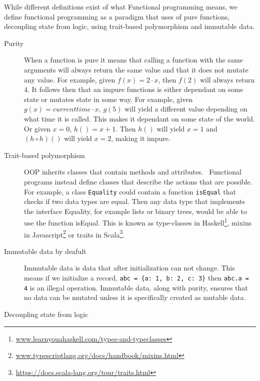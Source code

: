  While different definitions exist of what Functional programming means, we
 define functional programming as a paradigm that uses of pure functions,
 decoupling state from logic, using trait-based polymorphism and
 immutable data.

\begin{description}
\item[ Purity ]

When a function is pure it means that calling a function with the same arguments
        will always return the same value and that it does not mutate any value.
        For example, given $f(x) = 2\cdot x$, then $f(2)$ will always
        return $4$. It follows then that an impure functions is either dependant
        on some state or mutates state in some way. For example, given $g(x) =
        currenttime \cdot x$, $g(5)$ will yield a different value depending on
        what time it is called. This makes it dependant on some state of the
        world. Or given $x=0$, $h()=x+1$. Then $h()$ will yield $x=1$ and $(h
        \circ h)()$ will yield $x=2$, making it impure.~\cite{wikipedia_pure}

	\item[ Trait-based polymorphism ]

		OOP inherits classes that contain methods and
attributes.~\cite{Gamma:1995:DPE:186897} Functional programs instead
define classes that describe the actions that are possible. For example, a
class \texttt{Equality} could contain a function \texttt{isEqual} that checks
if two data types are equal. Then any data type that implements the interface
Equality, for example lists or binary trees, would be able to use the function
isEqual.  This is known as type-classes in
Haskell\footnote{\url{www.learnyouahaskell.com/types-and-typeclasses}}, mixins
in Javascript\footnote{\url{www.typescriptlang.org/docs/handbook/mixins.html}}
or traits in Scala\footnote{\url{https://docs.scala-lang.org/tour/traits.html}}.

\item[ Immutable data by deafult ]

Immutable data is data that after initialization can not change. This means if
we initialize a record, \texttt{abc = \{a: 1, b: 2, c: 3\}} then \texttt{abc.a
= 4} is an illegal operation. Immutable data, along with purity, ensures that
no data can be mutated unless it is specifically created as mutable data.

\item[Decoupling state from logic]


\end{description}

